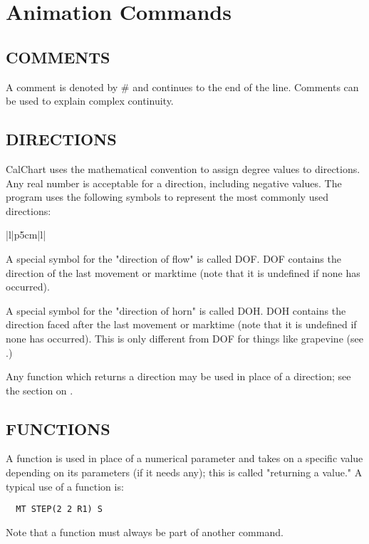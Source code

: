 \chapter{Animation Commands}\label{animcont}
\section{COMMENTS}\label{comments}
A comment is denoted by $\#$ and continues to the end of the line.
Comments can be used to explain complex continuity.

\section{DIRECTIONS}\label{directions}

CalChart uses the mathematical convention to assign degree values to
directions.  Any real number is acceptable for a direction, including
negative values.  The program uses the following symbols to represent the
most commonly used directions:

\begin{tabular}{|l|p{5cm}|l|}\hline
{}\hline\hline
{}
\end{tabular}

A special symbol for the "direction of flow" is called DOF.  DOF contains
the direction of the last movement or marktime (note that it is undefined
if none has occurred).

A special symbol for the "direction of horn" is called DOH.  DOH contains
the direction faced after the last movement or marktime (note that it is
undefined if none has occurred).  This is only different from DOF for
things like grapevine (see .)

Any function which returns a direction may be used in place of a direction;
see the section on .


\section{FUNCTIONS}\label{functions}

A function is used in place of a numerical parameter and takes on a
specific value depending on its parameters (if it needs any); this is
called "returning a value."  A typical use of a function is:
\begin{verbatim}
  MT STEP(2 2 R1) S
\end{verbatim}
Note that a function must always be part of another command.

